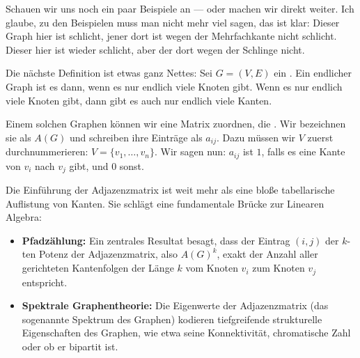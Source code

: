 \begin{spoken-clean}[00:25:30 - 00:28:30]
Schauen wir uns noch ein paar Beispiele an --- oder machen wir direkt weiter. Ich glaube, zu den Beispielen muss man nicht mehr viel sagen, das ist klar: Dieser Graph hier ist schlicht, jener dort ist wegen der Mehrfachkante nicht schlicht. Dieser hier ist wieder schlicht, aber der dort wegen der Schlinge nicht.

Die nächste Definition ist etwas ganz Nettes: Sei $G = (V, E)$ ein . Ein endlicher Graph ist es dann, wenn es nur endlich viele Knoten gibt. Wenn es nur endlich viele Knoten gibt, dann gibt es auch nur endlich viele Kanten.

Einem solchen Graphen können wir eine Matrix zuordnen, die . Wir bezeichnen sie als $A(G)$ und schreiben ihre Einträge als $a_{ij}$. Dazu müssen wir $V$ zuerst durchnummerieren: $V = \{v_1, \dots, v_n\}$. Wir sagen nun: $a_{ij}$ ist $1$, falls es eine Kante von $v_i$ nach $v_j$ gibt, und $0$ sonst.
\end{spoken-clean}

\begin{didactic-insight}
Die Einführung der Adjazenzmatrix ist weit mehr als eine bloße tabellarische Auflistung von Kanten. Sie schlägt eine fundamentale Brücke zur Linearen Algebra:
\begin{itemize}
    \item \textbf{Pfadzählung:} Ein zentrales Resultat besagt, dass der Eintrag $(i,j)$ der $k$-ten Potenz der Adjazenzmatrix, also $A(G)^k$, exakt der Anzahl aller gerichteten Kantenfolgen der Länge $k$ vom Knoten $v_i$ zum Knoten $v_j$ entspricht.
    \item \textbf{Spektrale Graphentheorie:} Die Eigenwerte der Adjazenzmatrix (das sogenannte Spektrum des Graphen) kodieren tiefgreifende strukturelle Eigenschaften des Graphen, wie etwa seine Konnektivität, chromatische Zahl oder ob er bipartit ist.
\end{itemize}
\end{didactic-insight}

